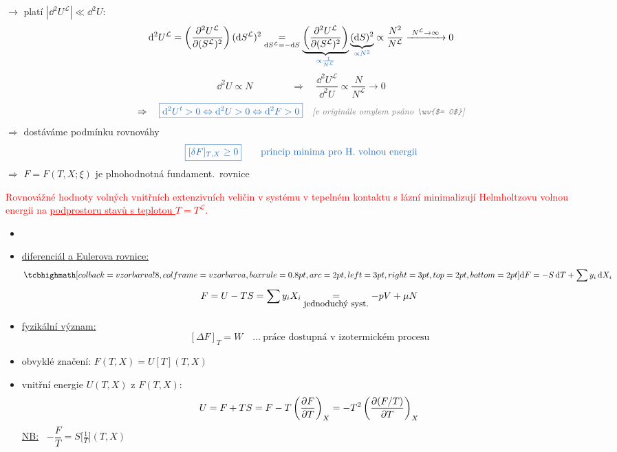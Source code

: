 $\to$ platí $|\dd^2U^{\mathcal{L}}|\ll\dd^2U$:
\[
  \dd^2U^{\mathcal{L}} = \left(\frac{\partial^2U^{\mathcal{L}}}{\partial(S^{\mathcal{L}})^2}\right)(\dd S^{\mathcal{L}})^2
  \underset{\dd S^{\mathcal{L}} = -\dd S}{=}
  \underbrace{\left(\frac{\partial^2U^{\mathcal{L}}}{\partial(S^{\mathcal{L}})^2}\right)}_{\textcolor{NavyBlue}{\propto\frac{1}{N^{\mathcal{L}}}}}
  \underbrace{(\dd S)^2}_{\textcolor{NavyBlue}{\propto N^2}}
  \propto \frac{N^2}{N^{\mathcal{L}}} \xrightarrow{\ N^{\mathcal{L}}\to\infty\ } 0
\]
\[
  \dd^2U\propto N \qquad\qquad \Rightarrow\quad \boxed{\frac{\dd^2U^{\mathcal{L}}}{\dd^2U}\propto\frac{N}{N^{\mathcal{L}}}\to 0}
\]
\[
  \Rightarrow\quad \textcolor{NavyBlue}{\boxed{\dd^2U^t > 0 \Leftrightarrow \dd^2U > 0 \Leftrightarrow \dd^2F > 0}}
  \quad \pozn{v originále omylem psáno \uv{$= 0$}}
\]
$\Rightarrow$ dostáváme podmínku rovnováhy
\[
  \textcolor{NavyBlue}{\boxed{[\delta F]_{T,X}\geq 0}} \qquad \textcolor{NavyBlue}{\text{princip minima pro H.\ volnou energii}}
\]
$\Rightarrow$ $F = F(T,X;\xi)$ je plnohodnotná fundament.\ rovnice

\begin{veta}
\textcolor{Red}{Rovnovážné hodnoty volných vnitřních extenzivních veličin v systému v tepelném kontaktu s lázní minimalizují Helmholtzovu volnou energii na \underline{podprostoru stavů s teplotou $T = T^{\mathcal{L}}$}.}
\end{veta}
\begin{itemize}
  \item {}
  \item \underline{diferenciál a Eulerova rovnice:}
  \[
    \vzorec{\dd F = -S\,\dd T + \sum y_i\,\dd X_i}
  \]
  \[
    F = U - TS = \sum y_iX_i \underset{\text{\small jednoduchý syst.}}{=} -pV + \mu N
  \]
  \item \underline{fyzikální význam:}
  \[
    [\Delta F]_T = W \quad\dots\ \text{práce dostupná v izotermickém procesu}
  \]
\end{itemize}

\begin{itemize}
  \item obvyklé značení: \quad $F(T,X) = U[T](T,X)$
  \item vnitřní energie $U(T,X)$ z $F(T,X)$:
  \[
    U = F + TS = F - T\left(\pdv{F}{T}\right)_X = -T^2\left(\frac{\partial(F/T)}{\partial T}\right)_X
  \]
  \textcolor{NavyBlue}{\underline{NB:} \ $-\dfrac{F}{T} = S\big[\tfrac1T\big](T,X)$}
\end{itemize}

